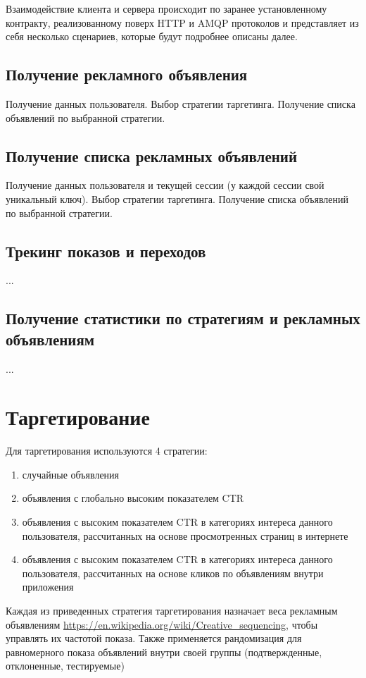 \documentclass[times]{itmo-student-thesis}
\begin{document}
Взаимодействие клиента и сервера происходит по заранее установленному контракту, реализованному поверх HTTP и AMQP протоколов и представляет из себя несколько сценариев, которые будут подробнее описаны далее.

\subsection{Получение рекламного объявления}
Получение данных пользователя. 
Выбор стратегии таргетинга. 
Получение списка объявлений по выбранной стратегии.

\subsection{Получение списка рекламных объявлений}
Получение данных пользователя и текущей сессии (у каждой сессии свой уникальный ключ). 
Выбор стратегии таргетинга. 
Получение списка объявлений по выбранной стратегии.

\subsection{Трекинг показов и переходов}
...

\subsection{Получение статистики по стратегиям и рекламных объявлениям}
...

\section{Таргетирование}


Для таргетирования используются 4 стратегии:
\begin{enumerate}
	\item случайные объявления
	\item объявления с глобально высоким показателем CTR
	\item объявления с высоким показателем CTR в категориях интереса данного пользователя, рассчитанных на основе просмотренных страниц в интернете
	\item объявления с высоким показателем CTR в категориях интереса данного пользователя, рассчитанных на основе кликов по объявлениям внутри приложения
\end{enumerate}

Каждая из приведенных стратегия таргетирования назначает веса рекламным объявлениям \url{https://en.wikipedia.org/wiki/Creative_sequencing}, чтобы управлять их частотой показа. Также применяется рандомизация для равномерного показа объявлений внутри своей группы (подтвержденные, отклоненные, тестируемые)
\end{document}
